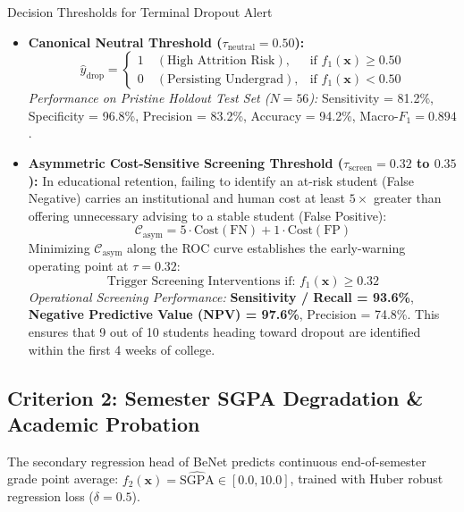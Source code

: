 \documentclass[10pt,a4paper]{article}
\begin{document}
\begin{criteriabox}{Decision Thresholds for Terminal Dropout Alert}
\begin{itemize}[noitemsep, topsep=2pt]
  \item \textbf{Canonical Neutral Threshold ($\tau_{\text{neutral}} = 0.50$):}
  \begin{equation}
    \hat{y}_{\text{drop}} = 
    \begin{cases}
      1 \quad (\text{High Attrition Risk}), & \text{if } f_1(\mathbf{x}) \ge 0.50 \\
      0 \quad (\text{Persisting Undergrad}), & \text{if } f_1(\mathbf{x}) < 0.50
    \end{cases}
  \end{equation}
  \textit{Performance on Pristine Holdout Test Set ($N=56$):} Sensitivity = 81.2\%, Specificity = 96.8\%, Precision = 83.2\%, Accuracy = 94.2\%, Macro-$F_1 = 0.894$.

  \item \textbf{Asymmetric Cost-Sensitive Screening Threshold ($\tau_{\text{screen}} = 0.32$ to $0.35$):}
  In educational retention, failing to identify an at-risk student (False Negative) carries an institutional and human cost at least $5\times$ greater than offering unnecessary advising to a stable student (False Positive):
  \begin{equation}
    \mathcal{C}_{\text{asym}} = 5 \cdot \text{Cost}(\text{FN}) + 1 \cdot \text{Cost}(\text{FP})
  \end{equation}
  Minimizing $\mathcal{C}_{\text{asym}}$ along the ROC curve establishes the early-warning operating point at $\tau = 0.32$:
  \begin{equation}
    \text{Trigger Screening Interventions if: } f_1(\mathbf{x}) \ge 0.32
  \end{equation}
  \textit{Operational Screening Performance:} \textbf{Sensitivity / Recall = 93.6\%}, \textbf{Negative Predictive Value (NPV) = 97.6\%}, Precision = 74.8\%.
  This ensures that 9 out of 10 students heading toward dropout are identified within the first 4 weeks of college.
\end{itemize}
\end{criteriabox}

\subsection{Criterion 2: Semester SGPA Degradation \& Academic Probation}
The secondary regression head of BeNet predicts continuous end-of-semester grade point average:
$f_2(\mathbf{x}) = \widehat{\text{SGPA}} \in [0.0, 10.0]$, trained with Huber robust regression loss ($\delta = 0.5$).
\end{document}
